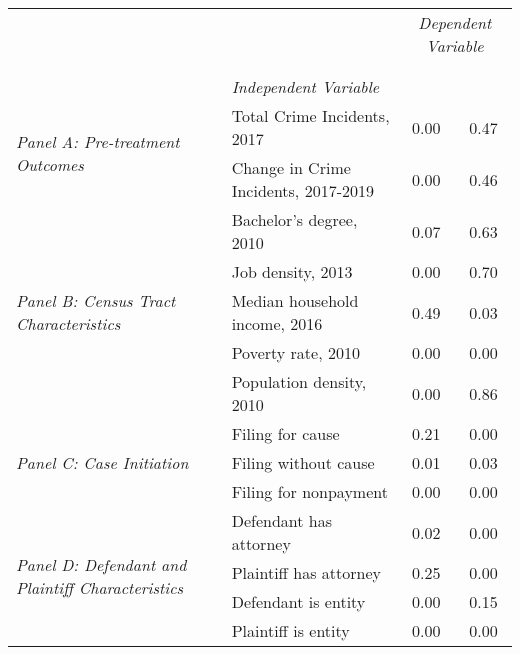 \begin{tabular}{llcc}
\toprule
 &  & \multicolumn{2}{c}{\textit{Dependent Variable}} \\
\cline{3-4}
\\
 &  &  &  \\
 & \emph{Independent Variable} &  &  \\
\midrule
\multirow[c]{2}{3cm}{\textit{Panel A: Pre-treatment Outcomes}} & Total Crime Incidents, 2017 & 0.00 & 0.47 \\
 & Change in Crime Incidents, 2017-2019 & 0.00 & 0.46 \\
\cline{1-4}
\multirow[c]{5}{3cm}{\textit{Panel B: Census Tract Characteristics}} & Bachelor's degree, 2010 & 0.07 & 0.63 \\
 & Job density, 2013 & 0.00 & 0.70 \\
 & Median household income, 2016 & 0.49 & 0.03 \\
 & Poverty rate, 2010 & 0.00 & 0.00 \\
 & Population density, 2010 & 0.00 & 0.86 \\
\cline{1-4}
\multirow[c]{3}{3cm}{\textit{Panel C: Case Initiation}} & Filing for cause & 0.21 & 0.00 \\
 & Filing without cause & 0.01 & 0.03 \\
 & Filing for nonpayment & 0.00 & 0.00 \\
\cline{1-4}
\multirow[c]{4}{3cm}{\textit{Panel D: Defendant and Plaintiff Characteristics}} & Defendant has attorney & 0.02 & 0.00 \\
 & Plaintiff has attorney & 0.25 & 0.00 \\
 & Defendant is entity & 0.00 & 0.15 \\
 & Plaintiff is entity & 0.00 & 0.00 \\
\cline{1-4}
\bottomrule
\end{tabular}
